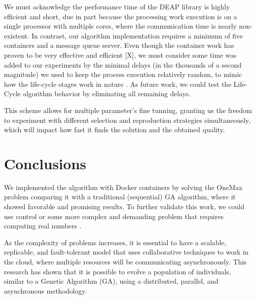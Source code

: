 \documentclass[runningheads]{llncs}
\begin{document}
We must acknowledge the performance time of the DEAP library
\cite{fortin2012deap} is highly efficient and short, due in part because the
processing work execution is on a single processor with multiple cores, where
the communication time is nearly non-existent. In contrast, our algorithm
implementation requires a minimum of five containers and a message queue
server. Even though the container work has proven to be very effective and
efficient [X], we must consider some time was added to our experiments by the
minimal delays (in the thousands of a second magnitude) we used to keep the
process execution relatively random, to mimic how the life-cycle stages work in
nature \cite{read1968system}. As future work, we could test the Life-Cycle
algorithm behavior by eliminating all remaining delays.

This scheme allows for multiple parameter's fine tunning, granting us the
freedom to experiment with different selection and reproduction strategies
simultaneously, which will impact how fast it finds the solution and the
obtained quality.

\section{Conclusions}

We implemented the algorithm with Docker containers by solving the OneMax
problem comparing it with a traditional (sequential) GA algorithm, where it
showed favorable and promising results. To further validate this work, we could
use control or some more complex and demanding problem that requires computing
real numbers \cite{stanley2002evolving,miikkulainen2019evolving}.

As the complexity of problems increases, it is essential to have a scalable,
replicable, and fault-tolerant model that uses collaborative techniques to work
in the cloud, where multiple resources will be communicating asynchronously.
This research has shown that it is possible to evolve a population of
individuals, similar to a Genetic Algorithm (GA), using a distributed,
parallel, and asynchronous methodology.


%
%
%



% 



%
%
%


%
\end{document}
